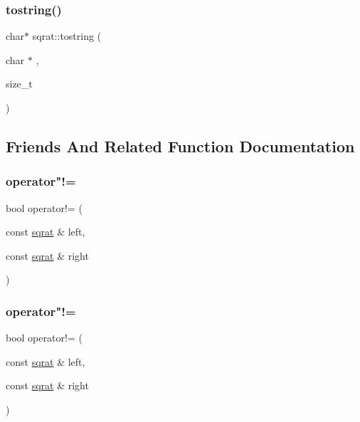 \subsubsection{\texorpdfstring{tostring()}{tostring()}\hspace{0.1cm}{\footnotesize\ttfamily [3/3]}}
{\footnotesize\ttfamily char$\ast$ sqrat\+::tostring (\begin{DoxyParamCaption}\item[{char $\ast$}]{,  }\item[{size\+\_\+t}]{ }\end{DoxyParamCaption})}



\subsection{Friends And Related Function Documentation}
\mbox{\label{classsqrat_ae100dba56606c0cfbbe45c04ae9f462a}} 
\subsubsection{\texorpdfstring{operator"!=}{operator!=}\hspace{0.1cm}{\footnotesize\ttfamily [1/3]}}
{\footnotesize\ttfamily bool operator!= (\begin{DoxyParamCaption}\item[{const \mbox{\hyperlink{classsqrat}{sqrat}} \&}]{left,  }\item[{const \mbox{\hyperlink{classsqrat}{sqrat}} \&}]{right }\end{DoxyParamCaption})\hspace{0.3cm}{\ttfamily [friend]}}

\mbox{\label{classsqrat_ae100dba56606c0cfbbe45c04ae9f462a}} 
\subsubsection{\texorpdfstring{operator"!=}{operator!=}\hspace{0.1cm}{\footnotesize\ttfamily [2/3]}}
{\footnotesize\ttfamily bool operator!= (\begin{DoxyParamCaption}\item[{const \mbox{\hyperlink{classsqrat}{sqrat}} \&}]{left,  }\item[{const \mbox{\hyperlink{classsqrat}{sqrat}} \&}]{right }\end{DoxyParamCaption})\hspace{0.3cm}{\ttfamily [friend]}}

